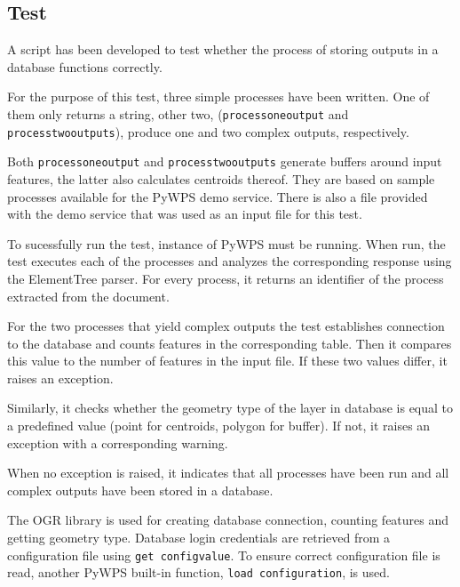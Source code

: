 \subsection{Test} 

A script has been developed to test whether the process of storing
outputs in a database functions correctly.

For the purpose of this test, three simple processes have been
written. One of them only returns a string, other two,
(\texttt{process\textunderscore one\textunderscore output} and
\texttt{process\textunderscore two\textunderscore outputs}), produce
one and two complex outputs, respectively.

Both \texttt{process\textunderscore one\textunderscore output} and
\texttt{process\textunderscore two\textunderscore outputs} generate
buffers around input features, the latter also calculates centroids
thereof. They are based on sample processes available for the PyWPS
demo service. There is also a  file provided with the demo
service that was used as an input file for this test.

To sucessfully run the test, instance of PyWPS must be running. When
run, the test executes each of the processes and analyzes the
corresponding  response using the ElementTree 
parser. For every process, it returns an identifier of the process
extracted from the  document.

For the two processes that yield complex outputs the test establishes
connection to the database and counts features in the corresponding
table. Then it compares this value to the number of features in the
input file. If these two values differ, it raises an exception.

Similarly, it checks whether the geometry type of the layer in
database is equal to a predefined value (point for centroids, polygon
for buffer). If not, it raises an exception with a corresponding
warning.

When no exception is raised, it indicates that all processes have been
run and all complex outputs have been stored in a database.

The OGR library is used for creating database connection, counting
features and getting geometry type. Database login credentials are
retrieved from a configuration file using \texttt{get\textunderscore
  config\textunderscore value}. To ensure correct configuration file
is read, another PyWPS built-in function, \texttt{load\textunderscore
  configuration}, is used.
